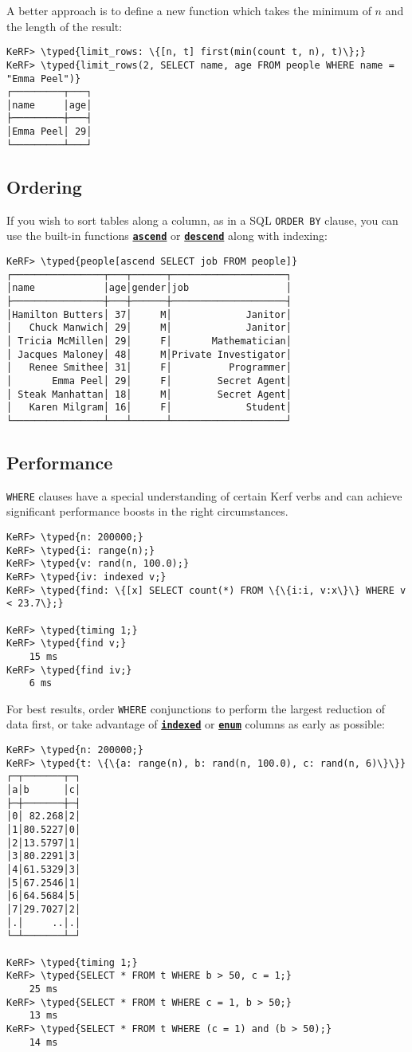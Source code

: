 \documentclass{article}
\newcommand{\typed}[1]{\textcolor{TealBlue}{#1}}
\newcommand{\primu}[2]{\hyperref[prim:#2]{\textbf{\texttt{#1}}}}
\newcommand{\prim}[1]{\primu{#1}{#1}}
\begin{document}
A better approach is to define a new function which takes the minimum of $n$ and the length of the result:
\begin{Verbatim}
KeRF> \typed{limit_rows: \{[n, t] first(min(count t, n), t)\};}
KeRF> \typed{limit_rows(2, SELECT name, age FROM people WHERE name = "Emma Peel")}
┌─────────┬───┐
│name     │age│
├─────────┼───┤
│Emma Peel│ 29│
└─────────┴───┘
\end{Verbatim}

\subsection{Ordering}
If you wish to sort tables along a column, as in a SQL \texttt{ORDER BY} clause, you can use the built-in functions \prim{ascend} or \prim{descend} along with indexing:
\begin{Verbatim}
KeRF> \typed{people[ascend SELECT job FROM people]}
┌────────────────┬───┬──────┬────────────────────┐
│name            │age│gender│job                 │
├────────────────┼───┼──────┼────────────────────┤
│Hamilton Butters│ 37│     M│             Janitor│
│   Chuck Manwich│ 29│     M│             Janitor│
│ Tricia McMillen│ 29│     F│       Mathematician│
│ Jacques Maloney│ 48│     M│Private Investigator│
│   Renee Smithee│ 31│     F│          Programmer│
│       Emma Peel│ 29│     F│        Secret Agent│
│ Steak Manhattan│ 18│     M│        Secret Agent│
│   Karen Milgram│ 16│     F│             Student│
└────────────────┴───┴──────┴────────────────────┘
\end{Verbatim}

\pagebreak
\subsection{Performance}
\texttt{WHERE} clauses have a special understanding of certain Kerf verbs and can achieve significant performance boosts in the right circumstances.
\begin{Verbatim}
KeRF> \typed{n: 200000;}
KeRF> \typed{i: range(n);}
KeRF> \typed{v: rand(n, 100.0);}
KeRF> \typed{iv: indexed v;}
KeRF> \typed{find: \{[x] SELECT count(*) FROM \{\{i:i, v:x\}\} WHERE v < 23.7\};}

KeRF> \typed{timing 1;}
KeRF> \typed{find v;}
    15 ms
KeRF> \typed{find iv;}
    6 ms
\end{Verbatim}

For best results, order \texttt{WHERE} conjunctions to perform the largest reduction of data first, or take advantage of \prim{indexed} or \prim{enum} columns as early as possible:
\begin{Verbatim}
KeRF> \typed{n: 200000;}
KeRF> \typed{t: \{\{a: range(n), b: rand(n, 100.0), c: rand(n, 6)\}\}}
┌─┬───────┬─┐
│a│b      │c│
├─┼───────┼─┤
│0│ 82.268│2│
│1│80.5227│0│
│2│13.5797│1│
│3│80.2291│3│
│4│61.5329│3│
│5│67.2546│1│
│6│64.5684│5│
│7│29.7027│2│
│.│     ..│.│
└─┴───────┴─┘

KeRF> \typed{timing 1;}
KeRF> \typed{SELECT * FROM t WHERE b > 50, c = 1;}
    25 ms
KeRF> \typed{SELECT * FROM t WHERE c = 1, b > 50;}
    13 ms
KeRF> \typed{SELECT * FROM t WHERE (c = 1) and (b > 50);}
    14 ms
\end{Verbatim}
\end{document}
